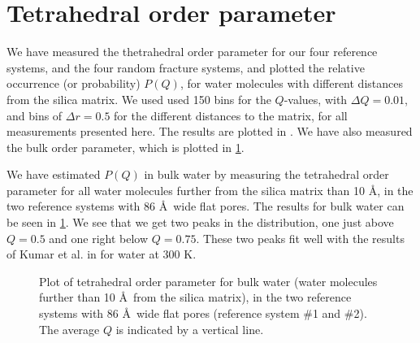 \section{Tetrahedral order parameter}
%
%

We have measured the thetrahedral order parameter for our four reference systems, and the four random fracture systems, and plotted the relative occurrence (or probability) $P(Q)$, for water molecules with different distances from the silica matrix. We used used 150 bins for the $Q$-values, with $\Delta Q = 0.01$, and bins of $\Delta r = 0.5$ for the different distances to the matrix, for all measurements presented here. The results are plotted in . We have also measured the bulk order parameter, which is plotted in \cref{fig:top_bulk}.

We have estimated $P(Q)$ in bulk water by measuring the tetrahedral order parameter for all water molecules further from the silica matrix than 10 \AA, in the two reference systems with 86 \AA\ wide flat pores. The results for bulk water can be seen in \cref{fig:top_bulk}. We see that we get two peaks in the distribution, one just above $Q = 0.5$ and one right below $Q = 0.75$. These two peaks fit well with the results of Kumar et al. in \cite{kumar2009tetrahedral} for water at 300 K.
%
\begin{figure}[!htb]%
    \centering%
    \caption{%
        Plot of tetrahedral order parameter for bulk water (water molecules further than 10 \AA\ from the silica matrix), in the two reference systems with 86 \AA\ wide flat pores (reference system \#1 and \#2). The average $Q$ is indicated by a vertical line. %
    }%
    \label{fig:top_bulk}%
\end{figure}%

